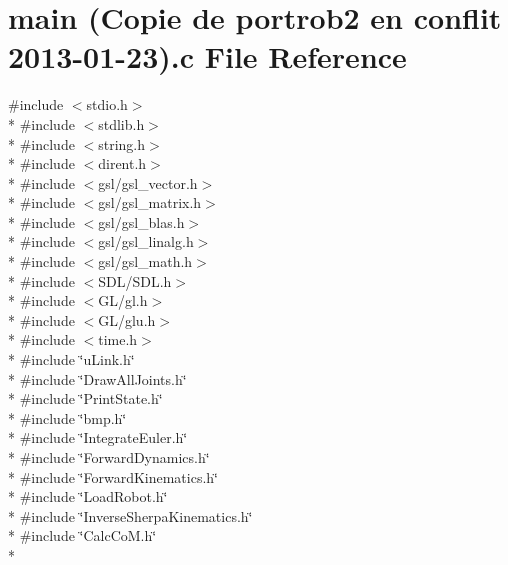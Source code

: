 \hypertarget{main_01_07_copie_01de_01portrob2_01en_01conflit_012013-01-23_08_8c}{\section{main (Copie de portrob2 en conflit 2013-\/01-\/23).c File Reference}
\label{main_01_07_copie_01de_01portrob2_01en_01conflit_012013-01-23_08_8c}
}
{\ttfamily \#include $<$stdio.\-h$>$}\\*
{\ttfamily \#include $<$stdlib.\-h$>$}\\*
{\ttfamily \#include $<$string.\-h$>$}\\*
{\ttfamily \#include $<$dirent.\-h$>$}\\*
{\ttfamily \#include $<$gsl/gsl\-\_\-vector.\-h$>$}\\*
{\ttfamily \#include $<$gsl/gsl\-\_\-matrix.\-h$>$}\\*
{\ttfamily \#include $<$gsl/gsl\-\_\-blas.\-h$>$}\\*
{\ttfamily \#include $<$gsl/gsl\-\_\-linalg.\-h$>$}\\*
{\ttfamily \#include $<$gsl/gsl\-\_\-math.\-h$>$}\\*
{\ttfamily \#include $<$S\-D\-L/\-S\-D\-L.\-h$>$}\\*
{\ttfamily \#include $<$G\-L/gl.\-h$>$}\\*
{\ttfamily \#include $<$G\-L/glu.\-h$>$}\\*
{\ttfamily \#include $<$time.\-h$>$}\\*
{\ttfamily \#include \char`\"{}u\-Link.\-h\char`\"{}}\\*
{\ttfamily \#include \char`\"{}Draw\-All\-Joints.\-h\char`\"{}}\\*
{\ttfamily \#include \char`\"{}Print\-State.\-h\char`\"{}}\\*
{\ttfamily \#include \char`\"{}bmp.\-h\char`\"{}}\\*
{\ttfamily \#include \char`\"{}Integrate\-Euler.\-h\char`\"{}}\\*
{\ttfamily \#include \char`\"{}Forward\-Dynamics.\-h\char`\"{}}\\*
{\ttfamily \#include \char`\"{}Forward\-Kinematics.\-h\char`\"{}}\\*
{\ttfamily \#include \char`\"{}Load\-Robot.\-h\char`\"{}}\\*
{\ttfamily \#include \char`\"{}Inverse\-Sherpa\-Kinematics.\-h\char`\"{}}\\*
{\ttfamily \#include \char`\"{}Calc\-Co\-M.\-h\char`\"{}}\\*
